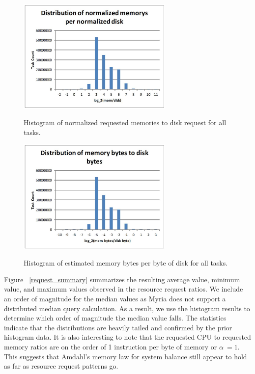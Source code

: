 \documentclass{sig-alternate}
\begin{document}
\begin{figure}
\centering
\includegraphics[width=3in]{../figures/req_mem_disk.jpg}
\label{req_mem_disk}
\caption{Histogram of normalized requested memories to disk request for all tasks.}
\end{figure}

\begin{figure}
\centering
\includegraphics[width=3in]{../figures/est_req_mem_disk.jpg}
\label{est_req_mem_disk}
\caption{Histogram of estimated memory bytes per byte of disk for all tasks.}
\end{figure}

Figure ~\ref{request_summary} summarizes the resulting average value, minimum value, and maximum values observed in the resource request ratios.
We include an order of magnitude for the median values as Myria does not support a distributed median query calculation.
As a result, we use the histogram results to determine which order of magnitude the median value falls.
The statistics indicate that the distributions are heavily tailed and confirmed by the prior histogram data.
It is also interesting to note that the requested CPU to requested memory ratios are on the order of 1 instruction per byte of memory or $\alpha ~= 1$.
This suggests that Amdahl's memory law for system balance still appear to hold as far as resource request patterns go.
\end{document}
